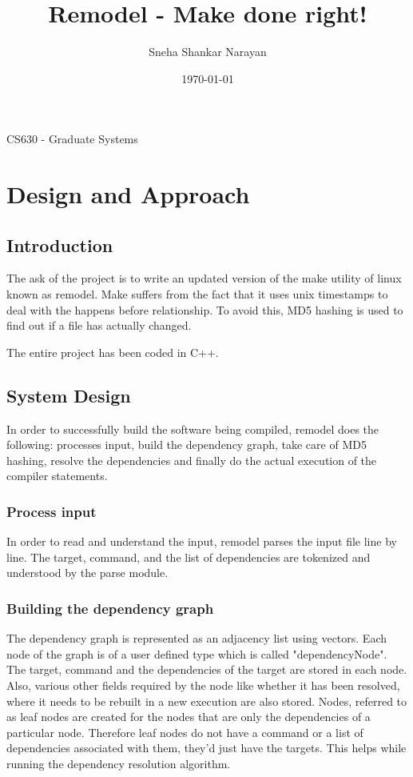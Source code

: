 \documentclass[a4paper, 12pt, notitlepage]{report}
\title{Remodel - Make done right! } %
\author{Sneha Shankar Narayan} %
\date{\today} %
\begin{document}
\maketitle
\begin{center}
CS630 - Graduate Systems
\end{center}
\thispagestyle{empty}
\newpage

\tableofcontents


\chapter{Design and Approach}
%
\section{Introduction}
The ask of the project is to write an updated version of the make utility of linux known as remodel. Make suffers from the fact that it uses unix timestamps to deal with the happens before relationship. To avoid this, MD5 hashing is used to find out if a file has actually changed. 

The entire project has been coded in C++.

\section{System Design}
In order to successfully build the software being compiled, remodel does the following: processes input, build the dependency graph, take care of MD5 hashing, resolve the dependencies and finally do the actual execution of the compiler statements.

\subsection{Process input}
In order to read and understand the input, remodel parses the input file line by line. The target, command, and the list of dependencies are tokenized and understood by the parse module.

\subsection{Building the dependency graph}
The dependency graph is represented as an adjacency list using vectors. Each node of the graph is of a user defined type which is called "dependencyNode". The target, command and the dependencies of the target are stored in each node. Also, various other fields required by the node like whether it has been resolved, where it needs to be rebuilt in a new execution are also stored. Nodes, referred to as leaf nodes are created for the nodes that are only the dependencies of a particular node. Therefore leaf nodes do not have a command or a list of dependencies associated with them, they'd just have the targets. This helps while running the dependency resolution algorithm.
\end{document}
